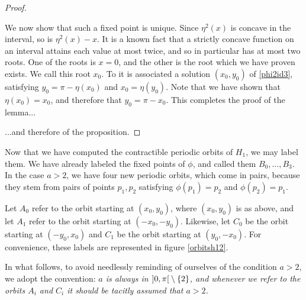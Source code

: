 \begin{proof}
\begin{lemmaproof}
We now show that such a fixed point is unique. Since $\eta^2(x)$ is concave in the interval, so is $\eta^2(x) - x$. It is a known fact that a strictly concave function on an interval attains each value at most twice, and so in particular has at most two roots. One of the roots is $x = 0$, and the other is the root which we have proven exists. We call this root $x_0$. To it is associated a solution $(x_0, y_0)$ of \eqref{phi2id3}, satisfying $y_0 = \pi - \eta(x_0)$ and $x_0 = \eta(y_0)$. Note that we have shown that $\eta(x_0) = x_0$, and therefore that $y_0 = \pi - x_0$. This completes the proof of the lemma...
\end{lemmaproof}
...and therefore of the proposition.
\end{proof}

Now that we have computed the contractible periodic orbits of $H_1$, we may label them. We have already labeled the fixed points of $\phi$, and called them $B_0, \dots, B_3$. In the case $a > 2$, we have four new periodic orbits, which come in pairs, because they stem from pairs of points $p_1, p_2$ satisfying $\phi(p_1) = p_2$ and $\phi(p_2) = p_1$.

Let $A_0$ refer to the orbit starting at $(x_0, y_0)$, where $(x_0, y_0)$ is as above, and let $A_1$ refer to the orbit starting at $(-x_0, -y_0)$. Likewise, let $C_0$ be the orbit starting at $(-y_0, x_0)$ and $C_1$ be the orbit starting at $(y_0, -x_0)$. For convenience, these labels are represented in figure \ref{orbitsh12}.

In what follows, to avoid needlessly reminding of ourselves of the condition $a>2$, we adopt the convention: \emph{$a$ is always in $\ointerval 0 \pi \setminus \{2\}$, and whenever we refer to the orbits $A_i$ and $C_i$ it should be tacitly assumed that $a > 2$.}

